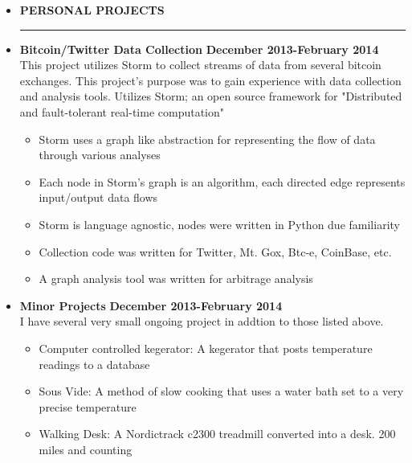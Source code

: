 \documentclass[overlapped]{res}
\begin{document}
\begin{resume}
\begin{itemize}[leftmargin=0in]
\begin{itemize}[leftmargin=0in]
    \item[] \textbf{PERSONAL PROJECTS} \\[-0.1in] \rule{\textwidth}{0.5pt}
            \item[] 
                \begin{samepage}
                    \textbf{Bitcoin/Twitter Data Collection} \hfill \textbf{December 2013-February 2014} \\
                    This project utilizes Storm to collect streams of data from several bitcoin exchanges. This 
                    project's purpose was to gain experience with data collection and analysis tools. Utilizes 
                    Storm; an open source framework for "Distributed and fault-tolerant real-time computation"
                    \begin{itemize}
                        \item[\textbullet] Storm uses a graph like abstraction for representing the flow of data through various analyses
                        \item[\textbullet] Each node in Storm's graph is an algorithm, each directed edge represents input/output data flows
                        \item[\textbullet] Storm is language agnostic, nodes were written in Python due familiarity
                        \item[\textbullet] Collection code was written for Twitter, Mt. Gox, Btc-e, CoinBase, etc.
                        \item[\textbullet] A graph analysis tool was written for arbitrage analysis
                    \end{itemize}
                \end{samepage}
            \item[] 
                \begin{samepage}
                    \textbf{Minor Projects} \hfill \textbf{December 2013-February 2014} \\
                    I have several very small ongoing project in addtion to those listed above.
                    \begin{itemize}
                        \item[\textbullet] Computer controlled kegerator:  A kegerator that posts temperature readings to a database
                        \item[\textbullet] Sous Vide:  A method of slow cooking that uses a water bath set to a very precise temperature
                        \item[\textbullet] Walking Desk:  A Nordictrack c2300 treadmill converted into a desk. 200 miles and counting
                    \end{itemize}
                \end{samepage}
        \end{itemize}
\end{itemize}
\vspace{0.25in}


\end{resume}
\end{document}
